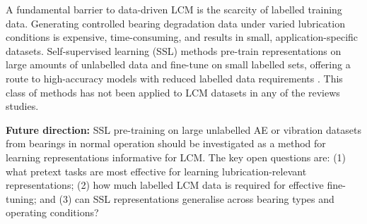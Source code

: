 A fundamental barrier to data-driven LCM is the scarcity of labelled training data. Generating controlled bearing degradation data under varied lubrication conditions is expensive, time-consuming, and results in small, application-specific datasets. Self-supervised learning (SSL) methods pre-train representations on large amounts of unlabelled data and fine-tune on small labelled sets, offering a route to high-accuracy models with reduced labelled data requirements \cite{zhang_self-supervised_2024}. This class of methods has not been applied to LCM datasets in any of the reviews studies.

\textbf{Future direction:} SSL pre-training on large unlabelled AE or vibration datasets from bearings in normal operation should be investigated as a method for learning representations informative for LCM. The key open questions are: (1) what pretext tasks are most effective for learning lubrication-relevant representations; (2) how much labelled LCM data is required for effective fine-tuning; and (3) can SSL representations generalise across bearing types and operating conditions?
